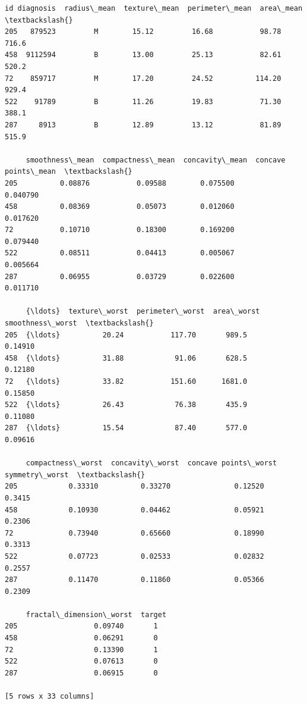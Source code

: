 \documentclass[11pt]{article}
\begin{document}
    \begin{Verbatim}[commandchars=\\\{\}]
          id diagnosis  radius\_mean  texture\_mean  perimeter\_mean  area\_mean  \textbackslash{}
205   879523         M        15.12         16.68           98.78      716.6
458  9112594         B        13.00         25.13           82.61      520.2
72    859717         M        17.20         24.52          114.20      929.4
522    91789         B        11.26         19.83           71.30      388.1
287     8913         B        12.89         13.12           81.89      515.9

     smoothness\_mean  compactness\_mean  concavity\_mean  concave points\_mean  \textbackslash{}
205          0.08876           0.09588        0.075500             0.040790
458          0.08369           0.05073        0.012060             0.017620
72           0.10710           0.18300        0.169200             0.079440
522          0.08511           0.04413        0.005067             0.005664
287          0.06955           0.03729        0.022600             0.011710

     {\ldots}  texture\_worst  perimeter\_worst  area\_worst  smoothness\_worst  \textbackslash{}
205  {\ldots}          20.24           117.70       989.5           0.14910
458  {\ldots}          31.88            91.06       628.5           0.12180
72   {\ldots}          33.82           151.60      1681.0           0.15850
522  {\ldots}          26.43            76.38       435.9           0.11080
287  {\ldots}          15.54            87.40       577.0           0.09616

     compactness\_worst  concavity\_worst  concave points\_worst  symmetry\_worst  \textbackslash{}
205            0.33310          0.33270               0.12520          0.3415
458            0.10930          0.04462               0.05921          0.2306
72             0.73940          0.65660               0.18990          0.3313
522            0.07723          0.02533               0.02832          0.2557
287            0.11470          0.11860               0.05366          0.2309

     fractal\_dimension\_worst  target
205                  0.09740       1
458                  0.06291       0
72                   0.13390       1
522                  0.07613       0
287                  0.06915       0

[5 rows x 33 columns]
    \end{Verbatim}
\end{document}
